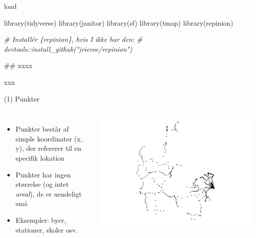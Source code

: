 \documentclass[
  8pt,
  ignorenonframetext,
  aspectratio=169]{beamer}
\newenvironment{Shaded}{}{}
\newcommand{\CommentTok}[1]{\textcolor[rgb]{0.38,0.63,0.69}{\textit{#1}}}
\newcommand{\FunctionTok}[1]{\textcolor[rgb]{0.02,0.16,0.49}{#1}}
\newcommand{\NormalTok}[1]{#1}
\newcommand{\columnsbegin}{\begin{columns}}
\newcommand{\columnsend}{\end{columns}}
\begin{document}
\begin{frame}[fragile]{load}
\protect\hypertarget{load}{}
\tiny

\begin{Shaded}
\begin{Highlighting}[]
\FunctionTok{library}\NormalTok{(tidyverse)}
\FunctionTok{library}\NormalTok{(janitor)}
\FunctionTok{library}\NormalTok{(sf)}
\FunctionTok{library}\NormalTok{(tmap)}
\FunctionTok{library}\NormalTok{(repinion)}

\CommentTok{\# Installér \{repinion\}, hvis I ikke har den:}
\CommentTok{\# devtools::install\_github("jvieroe/repinion")}
\end{Highlighting}
\end{Shaded}

\normalsize \#\# xxxx

xxx

\tiny

\normalsize
\end{frame}

\begin{frame}{(1) Punkter}
\protect\hypertarget{punkter}{}
\columnsbegin
{}

\begin{itemize}
\item
  Punkter består af simple koordinater (x, y), der refererer til en
  specifik lokation
\item
  Punkter har ingen størrelse (og intet \emph{areal}), de er uendeligt
  små
\item
  Eksempler: byer, stationer, skoler osv.
\end{itemize}


\tiny

\includegraphics[width=1\linewidth]{crashcourse_slides_files/figure-beamer/unnamed-chunk-3-1}

\normalsize

\columnsend
\end{frame}
\end{document}
